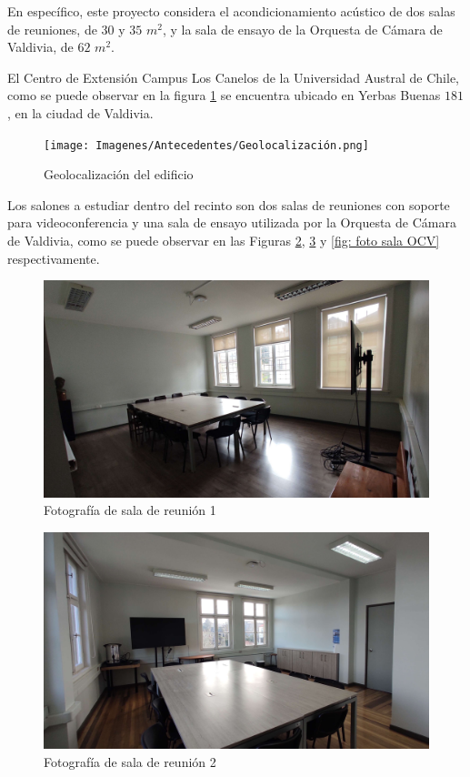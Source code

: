 \noindent En específico, este proyecto considera el acondicionamiento acústico de dos salas de reuniones, de $30$ y $35$ $m^2$, y la sala de ensayo de la Orquesta de Cámara de Valdivia, de $62$ $m^2$.

\noindent El Centro de Extensión Campus Los Canelos de la Universidad Austral de Chile, como se puede observar en la figura \ref{fig:geolocalización} se encuentra ubicado en Yerbas Buenas $181$, en la ciudad de Valdivia.
\begin{figure}[H]
    \centering
    \texttt{[image: Imagenes/Antecedentes/Geolocalización.png]}
    \caption{Geolocalización del edificio}
    \label{fig:geolocalización}
\end{figure}

\noindent Los salones a estudiar dentro del recinto son dos salas de reuniones con soporte para videoconferencia y una sala de ensayo utilizada por la Orquesta de Cámara de Valdivia, como se puede observar en las Figuras \ref{fig: foto sala1}, \ref{fig: foto sala2} y \ref{fig: foto sala OCV} respectivamente.
\begin{figure}[H]
    \centering
    \includegraphics[scale=0.1]{Imagenes/Antecedentes/Sala 1.jpg}
    \caption{Fotografía de sala de reunión 1}
    \label{fig: foto sala1}
\end{figure}

\begin{figure}[H]
    \centering
    \includegraphics[scale=0.1]{Imagenes/Antecedentes/Sala 2.jpg}
    \caption{Fotografía de sala de reunión 2}
    \label{fig: foto sala2}
\end{figure}

